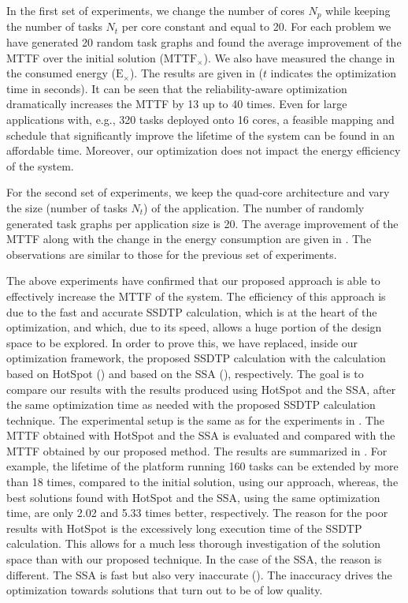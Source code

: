 In the first set of experiments, we change the number of cores $N_p$ while
keeping the number of tasks $N_t$ per core constant and equal to 20. For each
problem we have generated 20 random task graphs and found the average
improvement of the MTTF over the initial solution ($\scriptstyle
\text{MTTF}_\times$). We also have measured the change in the consumed energy
($\scriptstyle \text{E}_\times$). The results are given in 
($t$ indicates the optimization time in seconds). It can be seen that the
reliability-aware optimization dramatically increases the MTTF by 13 up to 40
times. Even for large applications with, e.g., 320 tasks deployed onto 16 cores,
a feasible mapping and schedule that significantly improve the lifetime of the
system can be found in an affordable time. Moreover, our optimization does not
impact the energy efficiency of the system.

For the second set of experiments, we keep the quad-core architecture and vary
the size (number of tasks $N_t$) of the application. The number of randomly
generated task graphs per application size is 20. The average improvement of the
MTTF along with the change in the energy consumption are given in
. The observations are similar to those for the previous set of
experiments.

The above experiments have confirmed that our proposed approach is able to
effectively increase the MTTF of the system. The efficiency of this approach is
due to the fast and accurate SSDTP calculation, which is at the heart of the
optimization, and which, due to its speed, allows a huge portion of the design
space to be explored. In order to prove this, we have replaced, inside our
optimization framework, the proposed SSDTP calculation with the calculation
based on HotSpot () and based on the SSA
(), respectively. The goal is to compare
our results with the results produced using HotSpot and the SSA, after the same
optimization time as needed with the proposed SSDTP calculation technique. The
experimental setup is the same as for the experiments in
. The MTTF obtained with HotSpot and the SSA is evaluated
and compared with the MTTF obtained by our proposed method. The results are
summarized in . For example, the lifetime of the
platform running 160 tasks can be extended by more than 18 times, compared to
the initial solution, using our approach, whereas, the best solutions found with
HotSpot and the SSA, using the same optimization time, are only 2.02 and 5.33
times better, respectively. The reason for the poor results with HotSpot is the
excessively long execution time of the SSDTP calculation. This allows for a much
less thorough investigation of the solution space than with our proposed
technique. In the case of the SSA, the reason is different. The SSA is fast but
also very inaccurate (). The inaccuracy
drives the optimization towards solutions that turn out to be of low quality.

